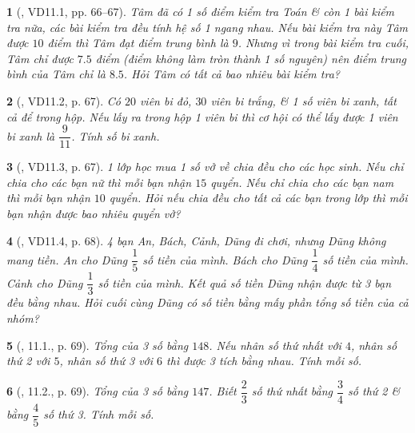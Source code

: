 \documentclass{article}
\newtheorem{baitoan}{}
\begin{document}
\begin{baitoan}[\cite{TLCT_THCS_Toan_6_so_hoc}, VD11.1, pp. 66--67]
	Tâm đã có 1 số điểm kiểm tra Toán \& còn 1 bài kiểm tra nữa, các bài kiểm tra đều tính hệ số 1 ngang nhau. Nếu bài kiểm tra này Tâm được $10$ điểm thì Tâm đạt điểm trung bình là $9$. Nhưng vì trong bài kiểm tra cuối, Tâm chỉ được $7.5$ điểm (điểm không làm tròn thành 1 số nguyên) nên điểm trung bình của Tâm chỉ là $8.5$. Hỏi Tâm có tất cả bao nhiêu bài kiểm tra?
\end{baitoan}

\begin{baitoan}[\cite{TLCT_THCS_Toan_6_so_hoc}, VD11.2, p. 67]
	Có $20$ viên bi đỏ, $30$ viên bi trắng, \& 1 số viên bi xanh, tất cả để trong hộp. Nếu lấy ra trong hộp 1 viên bi thì cơ hội có thể lấy được 1 viên bi xanh là $\dfrac{9}{11}$. Tính số bi xanh.
\end{baitoan}

\begin{baitoan}[\cite{TLCT_THCS_Toan_6_so_hoc}, VD11.3, p. 67]
	1 lớp học mua 1 số vở về chia đều cho các học sinh. Nếu chỉ chia cho các bạn nữ thì mỗi bạn nhận $15$ quyển. Nếu chỉ chia cho các bạn nam thì mỗi bạn nhận $10$ quyển. Hỏi nếu chia đều cho tất cả các bạn trong lớp thì mỗi bạn nhận được bao nhiêu quyển vở?
\end{baitoan}

\begin{baitoan}[\cite{TLCT_THCS_Toan_6_so_hoc}, VD11.4, p. 68]
	4 bạn An, Bách, Cảnh, Dũng đi chơi, nhưng Dũng không mang tiền. An cho Dũng $\dfrac{1}{5}$ số tiền của mình. Bách cho Dũng $\dfrac{1}{4}$ số tiền của mình. Cảnh cho Dũng $\dfrac{1}{3}$ số tiền của mình. Kết quả số tiền Dũng nhận được từ 3 bạn đều bằng nhau. Hỏi cuối cùng Dũng có số tiền bằng mấy phần tổng số tiền của cả nhóm?
\end{baitoan}

\begin{baitoan}[\cite{TLCT_THCS_Toan_6_so_hoc}, 11.1., p. 69]
	Tổng của 3 số bằng $148$. Nếu nhân số thứ nhất với $4$, nhân số thứ 2 với $5$, nhân số thứ 3 với $6$ thì được 3 tích bằng nhau. Tính mỗi số.
\end{baitoan}

\begin{baitoan}[\cite{TLCT_THCS_Toan_6_so_hoc}, 11.2., p. 69]
	Tổng của 3 số bằng $147$. Biết $\dfrac{2}{3}$ số thứ nhất bằng $\dfrac{3}{4}$ số thứ 2 \& bằng $\dfrac{4}{5}$ số thứ 3. Tính mỗi số.
\end{baitoan}
\end{document}
